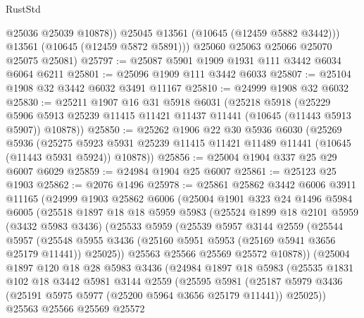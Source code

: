 \begin{lexlean}{RustStd}
\begin{coremodule}
              @25036
              @25039
              @10878))
          @25045
          @13561
          (@10645 (@12459 @5882 @3442)))
        @13561
        (@10645 (@12459 @5872 @5891)))
      @25060
      @25063
      @25066
      @25070
      @25075
      @25081)
@25797 := @25087 @5901 @1909 @1931 @111 @3442 @6034 @6064 @6211
@25801 := @25096 @1909 @111 @3442 @6033
@25807 := @25104 @1908 @32 @3442 @6032 @3491 @11167
@25810 := @24999 @1908 @32 @6032
@25830 := @25211
    @1907
    @16
    @31
    @5918
    @6031
    (@25218
      @5918
      (@25229 @5906 @5913 @25239 @11415 @11421 @11437 @11441 (@10645 (@11443 @5913 @5907)) @10878))
@25850 := @25262
    @1906
    @22
    @30
    @5936
    @6030
    (@25269
      @5936
      (@25275 @5923 @5931 @25239 @11415 @11421 @11489 @11441 (@10645 (@11443 @5931 @5924)) @10878))
@25856 := @25004 @1904 @337 @25 @29 @6007 @6029
@25859 := @24984 @1904 @25 @6007
@25861 := @25123 @25 @1903
@25862 := @2076 @1496
@25978 := @25861
    @25862
    @3442
    @6006
    @3911
    @11165
    (@24999
      @1903
      @25862
      @6006
      (@25004
        @1901
        @323
        @24
        @1496
        @5984
        @6005
        (@25518
          @1897
          @18
          @18
          @5959
          @5983
          (@25524
            @1899
            @18
            @2101
            @5959
            (@3432 @5983 @3436)
            (@25533
              @5959
              (@25539
                @5957
                @3144
                @2559
                (@25544
                  @5957
                  (@25548
                    @5955
                    @3436
                    (@25160 @5951 @5953 (@25169 @5941 @3656 @25179 @11441))
                    @25025))
                @25563
                @25566
                @25569
                @25572
                @10878))
            (@25004
              @1897
              @120
              @18
              @28
              @5983
              @3436
              (@24984
                @1897
                @18
                @5983
                (@25535
                  @1831
                  @102
                  @18
                  @3442
                  @5981
                  @3144
                  @2559
                  (@25595
                    @5981
                    (@25187
                      @5979
                      @3436
                      (@25191 @5975 @5977 (@25200 @5964 @3656 @25179 @11441))
                      @25025))
                  @25563
                  @25566
                  @25569
                  @25572

\end{coremodule}
\end{lexlean}

